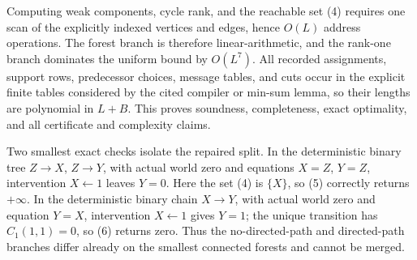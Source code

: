 Computing weak components, cycle rank, and the reachable set (4) requires one scan of the explicitly indexed vertices and edges, hence \(O(L)\) address operations.  The forest branch is therefore linear-arithmetic, and the rank-one branch dominates the uniform bound by \(O(L^7)\).  All recorded assignments, support rows, predecessor choices, message tables, and cuts occur in the explicit finite tables considered by the cited compiler or min-sum lemma, so their lengths are polynomial in \(L+B\).  This proves soundness, completeness, exact optimality, and all certificate and complexity claims.

Two smallest exact checks isolate the repaired split.  In the deterministic binary tree \(Z\to X\), \(Z\to Y\), with actual world zero and equations \(X=Z\), \(Y=Z\), intervention \(X\leftarrow1\) leaves \(Y=0\).  Here the set (4) is \(\{X\}\), so (5) correctly returns \(+\infty\).  In the deterministic binary chain \(X\to Y\), with actual world zero and equation \(Y=X\), intervention \(X\leftarrow1\) gives \(Y=1\); the unique transition has \(C_1(1,1)=0\), so (6) returns zero.  Thus the no-directed-path and directed-path branches differ already on the smallest connected forests and cannot be merged.
